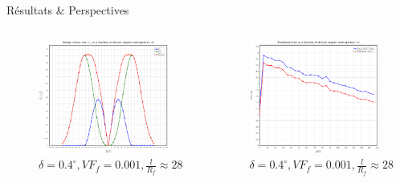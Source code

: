\documentclass[final]{beamer}
\begin{document}
\begin{frame}
\begin{center}
\begin{minipage}{\textwidth}
\begin{alertblock}{\rule[-0.6ex]{0pt}{50pt}\centering\LARGE R\'esultats \& Perspectives}
\begin{columns}
\begin{column}{0.375\textwidth}
\begin{center}
\captionsetup[subfigure]{labelformat=empty}
\begin{figure}[!h]
\centering
 \includegraphics[width=0.9\columnwidth]{2017-03-03_AbqRunSummary_Gs.pdf}
 \caption{$\delta=0.4^{\circ},VF_{f}=0.001,\frac{l}{R_{f}}\approx28$}
\end{figure}
     \end{center}
\end{column}
\begin{column}{0.375\textwidth}  %
    \begin{center}
\begin{figure}[!h]
\centering
     \includegraphics[width=0.9\columnwidth]{cpus-time.pdf}
 \caption{$\delta=0.4^{\circ},VF_{f}=0.001,\frac{l}{R_{f}}\approx28$}
\end{figure}
     \end{center}
\end{column}
\end{columns}
\end{alertblock}
\end{minipage}
\end{center}


\end{frame}
\end{document}
